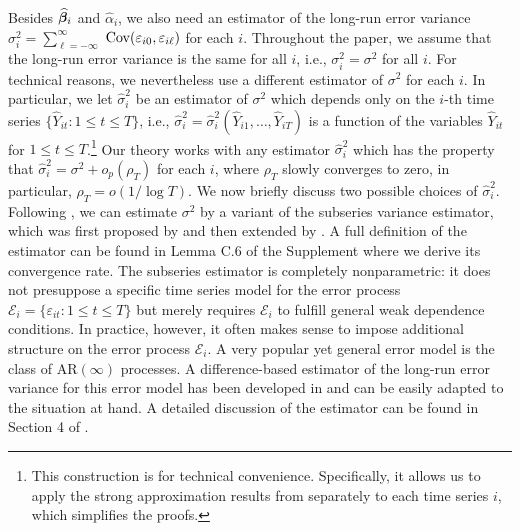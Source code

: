 \documentclass[12pt]{article}
\begin{document}
Besides $\widehat{\bm{\beta}}_i$ and $\widehat{\alpha}_i$, we also need an estimator of the long-run error variance $\sigma_i^2 = \sum\nolimits_{\ell=-\infty}^{\infty}$ $\textnormal{Cov}(\varepsilon_{i0}, \varepsilon_{i\ell})$ for each $i$. Throughout the paper, we assume that the long-run error variance is the same for all $i$, i.e., $\sigma_i^2 = \sigma^2$ for all $i$.  For technical reasons, we nevertheless use a different estimator of $\sigma^2$ for each $i$. In particular, we let $\widehat{\sigma}_i^2$ be an estimator of $\sigma^2$ which depends only on the $i$-th time series $\{ \widehat{Y}_{it}: 1 \le t \le T \}$, i.e., $\widehat{\sigma}_i^2 = \widehat{\sigma}_i^2(\widehat{Y}_{i1},\ldots,\widehat{Y}_{iT})$ is a function of the variables $\widehat{Y}_{it}$ for $1 \le t \le T$.\footnote{This construction is for technical convenience. Specifically, it allows us to apply the strong approximation results from \cite{BerkesLiuWu2014} separately to each time series $i$, which simplifies the proofs.} Our theory works with any estimator $\widehat{\sigma}_i^2$ which has the property that $\widehat{\sigma}_i^2 = \sigma^2 + o_p(\rho_T)$ for each $i$, where $\rho_T$ slowly converges to zero, in particular, $\rho_T = o(1/\log T)$. We now briefly discuss two possible choices of $\widehat{\sigma}_i^2$. Following \cite{Kim2016}, we can estimate $\sigma^2$ by a variant of the subseries variance estimator, which was first proposed by \cite{Carlstein1986} and then extended by \cite{WuZhao2007}. A full definition of the estimator can be found in Lemma C.6 %
of the Supplement where we derive its convergence rate. 
The subseries estimator is completely nonparametric: it does not presuppose a specific time series model for the error process $\mathcal{E}_i = \{ \varepsilon_{it}: 1 \le t \le T\}$ but merely requires $\mathcal{E}_i$ to fulfill general weak dependence conditions. In practice, however, it often makes sense to impose additional structure on the error process $\mathcal{E}_i$. A very popular yet general error model is the class of $\text{AR}(\infty)$ processes. A difference-based estimator of the long-run error variance for this error model has been developed in \cite{KhismatullinaVogt2020} and can be easily adapted to the situation at hand. A detailed discussion of the estimator can be found in Section 4 of \cite{KhismatullinaVogt2020}. 
\end{document}
